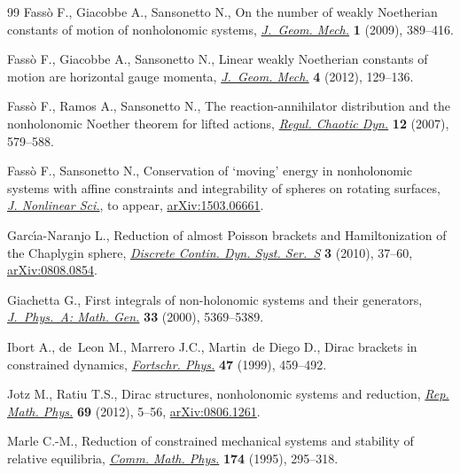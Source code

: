 \documentclass[pdftex]{sigma}
\numberwithin{equation}{section}
\begin{document}
\begin{thebibliography}{99}
Fass{\`o} F., Giacobbe A., Sansonetto N., On the number of weakly {N}oetherian
  constants of motion of nonholonomic systems, \href{http://dx.doi.org/10.3934/jgm.2009.1.389}{\textit{J.~Geom. Mech.}}
  \textbf{1} (2009), 389--416.

Fass{\`o} F., Giacobbe A., Sansonetto N., Linear weakly {N}oetherian constants
  of motion are horizontal gauge momenta, \href{http://dx.doi.org/10.3934/jgm.2012.4.129}{\textit{J.~Geom. Mech.}} \textbf{4}
  (2012), 129--136.

Fass{\`o} F., Ramos A., Sansonetto N., The reaction-annihilator distribution
  and the nonholonomic {N}oether theorem for lifted actions, \href{http://dx.doi.org/10.1134/S1560354707060019}{\textit{Regul.
  Chaotic Dyn.}} \textbf{12} (2007), 579--588.

Fass{\`o} F., Sansonetto N., Conservation of `moving' energy in nonholonomic
  systems with af\/f\/ine constraints and integrability of spheres on rotating
  surfaces, \href{http://dx.doi.org/10.1007/s00332-015-9283-4}{\textit{J. Nonlinear Sci.}}, {t}o appear, \href{http://arxiv.org/abs/1503.06661}{arXiv:1503.06661}.

Garc{\'{\i}}a-Naranjo L., Reduction of almost {P}oisson brackets and
  {H}amiltonization of the {C}haplygin sphere, \href{http://dx.doi.org/10.3934/dcdss.2010.3.37}{\textit{Discrete Contin. Dyn.
  Syst. Ser.~S}} \textbf{3} (2010), 37--60, \href{http://arxiv.org/abs/0808.0854}{arXiv:0808.0854}.

Giachetta G., First integrals of non-holonomic systems and their generators,
  \href{http://dx.doi.org/10.1088/0305-4470/33/30/308}{\textit{J.~Phys.~A: Math. Gen.}} \textbf{33} (2000), 5369--5389.

Ibort A., de~Leon M., Marrero J.C., Martin~de Diego D., Dirac brackets in
  constrained dynamics, \href{http://dx.doi.org/10.1002/(SICI)1521-3978(199906)47:5<459::AID-PROP459>3.0.CO;2-E}{\textit{Fortschr. Phys.}} \textbf{47} (1999), 459--492.

Jotz M., Ratiu T.S., Dirac structures, nonholonomic systems and reduction,
  \href{http://dx.doi.org/10.1016/S0034-4877(12)60016-0}{\textit{Rep. Math. Phys.}} \textbf{69} (2012), 5--56, \href{http://arxiv.org/abs/0806.1261}{arXiv:0806.1261}.

Marle C.-M., Reduction of constrained mechanical systems and stability of
  relative equilibria, \href{http://dx.doi.org/10.1007/BF02099604}{\textit{Comm. Math. Phys.}} \textbf{174} (1995),
  295--318.


\end{thebibliography}
\end{document}
